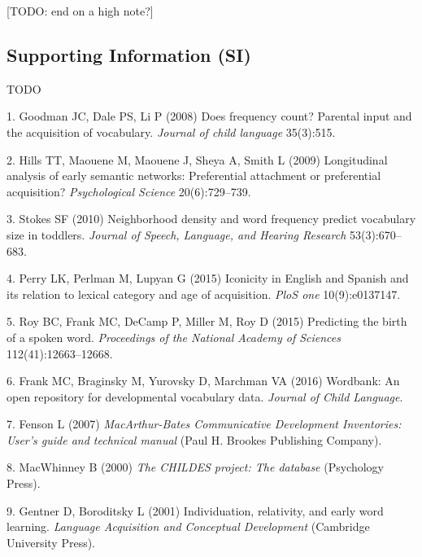 \documentclass[9pt,twocolumn,twoside]{pnas-new}
\begin{document}
{[}TODO: end on a high note?{]}

\subsection*{Supporting Information
(SI)}\label{supporting-information-si}

TODO

\showmatmethods
\showacknow
\pnasbreak

\hypertarget{refs}{}
\hypertarget{ref-goodman2008}{}
1. Goodman JC, Dale PS, Li P (2008) Does frequency count? Parental input
and the acquisition of vocabulary. \emph{Journal of child language}
35(3):515.

\hypertarget{ref-hills2009}{}
2. Hills TT, Maouene M, Maouene J, Sheya A, Smith L (2009) Longitudinal
analysis of early semantic networks: Preferential attachment or
preferential acquisition? \emph{Psychological Science} 20(6):729--739.

\hypertarget{ref-stokes2010}{}
3. Stokes SF (2010) Neighborhood density and word frequency predict
vocabulary size in toddlers. \emph{Journal of Speech, Language, and
Hearing Research} 53(3):670--683.

\hypertarget{ref-perry2015}{}
4. Perry LK, Perlman M, Lupyan G (2015) Iconicity in English and Spanish
and its relation to lexical category and age of acquisition. \emph{PloS
one} 10(9):e0137147.

\hypertarget{ref-roy2015}{}
5. Roy BC, Frank MC, DeCamp P, Miller M, Roy D (2015) Predicting the
birth of a spoken word. \emph{Proceedings of the National Academy of
Sciences} 112(41):12663--12668.

\hypertarget{ref-frank2016}{}
6. Frank MC, Braginsky M, Yurovsky D, Marchman VA (2016) Wordbank: An
open repository for developmental vocabulary data. \emph{Journal of
Child Language}.

\hypertarget{ref-fenson2007}{}
7. Fenson L (2007) \emph{MacArthur-Bates Communicative Development
Inventories: User's guide and technical manual} (Paul H. Brookes
Publishing Company).

\hypertarget{ref-macwhinney2000}{}
8. MacWhinney B (2000) \emph{The CHILDES project: The database}
(Psychology Press).

\hypertarget{ref-gentner2001}{}
9. Gentner D, Boroditsky L (2001) Individuation, relativity, and early
word learning. \emph{Language Acquisition and Conceptual Development}
(Cambridge University Press).
\end{document}
